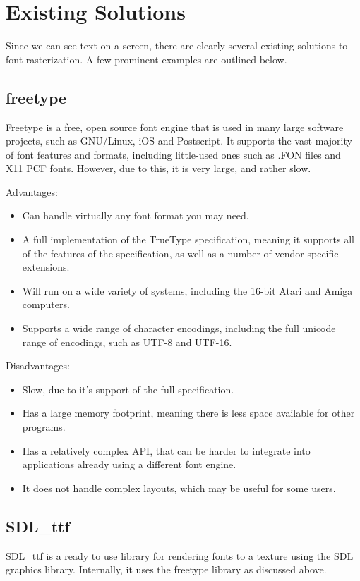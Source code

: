 \documentclass{report}
\begin{document}
\section{Existing Solutions}

Since we can see text on a screen, there are clearly several existing solutions
to font rasterization. A few prominent examples are outlined below.



\subsection{freetype}
Freetype is a free, open source font engine that is used in many large software
projects, such as GNU/Linux, iOS and Postscript. It supports the vast majority
of font features and formats, including little-used ones such as .FON files and
X11 PCF fonts. However, due to this, it is very large, and rather slow.

Advantages:
\begin{itemize}
\item{Can handle virtually any font format you may need.}
\item{A full implementation of the TrueType specification, meaning it supports
    all of the features of the specification, as well as a number of vendor
    specific extensions.}
\item{Will run on a wide variety of systems, including the 16-bit Atari and
    Amiga computers.}
\item{Supports a wide range of character encodings, including the full unicode
    range of encodings, such as UTF-8 and UTF-16.}
\end{itemize}

Disadvantages:
\begin{itemize}
\item{Slow, due to it's support of the full specification.}
\item{Has a large memory footprint, meaning there is less space available for
    other programs.}
\item{Has a relatively complex API, that can be harder to integrate into
    applications already using a different font engine.}
\item{It does not handle complex layouts, which may be useful for some users.}
\end{itemize}

\subsection{SDL\_ttf}
SDL\_ttf is a ready to use library for rendering fonts to a texture using the
SDL graphics library. Internally, it uses the freetype library as discussed above.
\end{document}
